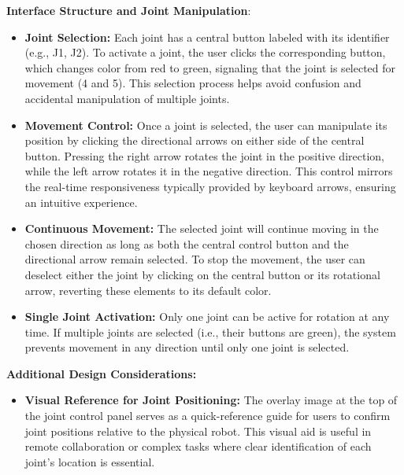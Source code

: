 \textbf{Interface Structure and Joint Manipulation}:
\begin{itemize}
    \item \textbf{Joint Selection:} Each joint has a central button labeled with its identifier (e.g., J1, J2). To activate a joint, the user clicks the corresponding button, which changes color from red to green, signaling that the joint is selected for movement (4 and 5). This selection process helps avoid confusion and accidental manipulation of multiple joints.

    \item \textbf{Movement Control:} Once a joint is selected, the user can manipulate its position by clicking the directional arrows on either side of the central button. Pressing the right arrow rotates the joint in the positive direction, while the left arrow rotates it in the negative direction. This control mirrors the real-time responsiveness typically provided by keyboard arrows, ensuring an intuitive experience.

    \item \textbf{Continuous Movement:} The selected joint will continue moving in the chosen direction as long as both the central control button and the directional arrow remain selected. To stop the movement, the user can deselect either the joint by clicking on the central button or its rotational arrow, reverting these elements to its default color.

    \item \textbf{Single Joint Activation: }Only one joint can be active for rotation at any time. If multiple joints are selected (i.e., their buttons are green), the system prevents movement in any direction until only one joint is selected.

\end{itemize}

\textbf{Additional Design Considerations: }
\begin{itemize}
    \item \textbf{Visual Reference for Joint Positioning:} The overlay image at the top of the joint control panel serves as a quick-reference guide for users to confirm joint positions relative to the physical robot. This visual aid is useful in remote collaboration or complex tasks where clear identification of each joint’s location is essential.

\end{itemize}

